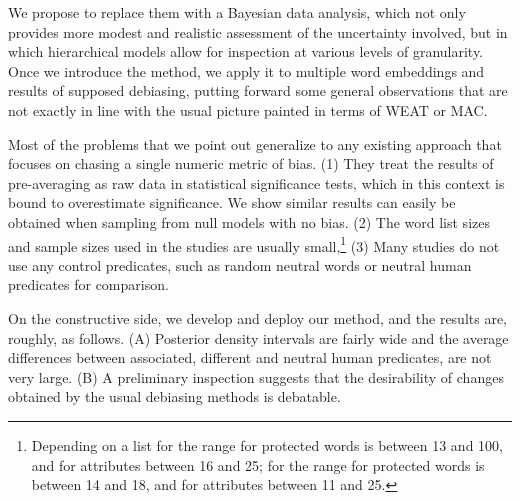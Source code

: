 \documentclass{clv3}
\begin{document}
We propose to replace them with a Bayesian data analysis, which not only
provides more modest and realistic assessment of the uncertainty
involved, but in which hierarchical models allow for inspection at
various levels of granularity. Once we introduce the method, we apply it
to multiple word embeddings and results of supposed debiasing, putting
forward some general observations that are not exactly in line with the
usual picture painted in terms of \textsf{WEAT} or \textsf{MAC}.

Most of the problems that we point out generalize to any existing
approach that focuses on chasing a single numeric metric of bias. (1)
They treat the results of pre-averaging as raw data in statistical
significance tests, which in this context is bound to overestimate
significance. We show similar results can easily be obtained when
sampling from null models with no bias. (2) The word list sizes and
sample sizes used in the studies are usually small,\footnote{Depending
  on a list for \citep{Caliskan2017semanticsBiases} the range for protected words is between 13 and
  100, and for attributes between 16 and 25; for \citep{Manzini2019blackToCriminal} the range for
  protected words is between 14 and 18, and for attributes between 11
  and 25.} (3) Many studies do not use any control predicates, such as
random neutral words or neutral human predicates for comparison.

On the constructive side, we develop and deploy our method, and the
results are, roughly, as follows. (A) Posterior density intervals are
fairly wide and the average differences between associated, different
and neutral human predicates, are not very large. (B) A preliminary
inspection suggests that the desirability of changes obtained by the
usual debiasing methods is debatable.
\end{document}
